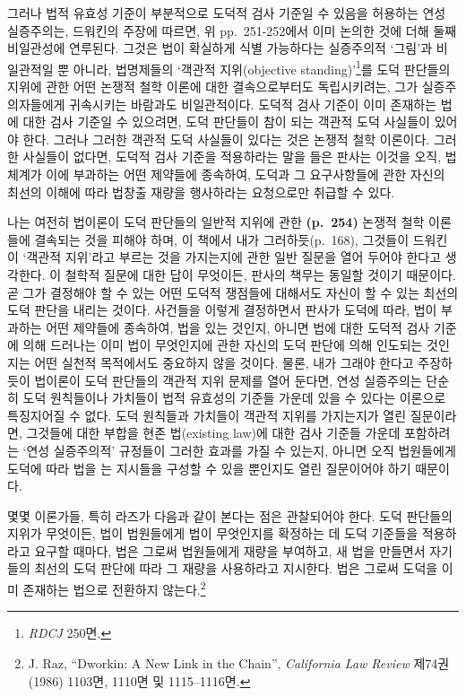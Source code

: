 그러나 법적 유효성 기준이 부분적으로 도덕적 검사 기준일 수 있음을
허용하는 연성 실증주의는, 드워킨의 주장에 따르면, 위 pp.~251-252에서
이미 논의한 것에 더해 둘째 비일관성에 연루된다. 그것은 법이 확실하게
식별 가능하다는 실증주의적 ‘그림’과 비일관적일 뿐 아니라, 법명제들의
‘객관적 지위(objective standing)’\footnote{\emph{RDCJ} 250면.}를 도덕
판단들의 지위에 관한 어떤 논쟁적 철학 이론에 대한 결속으로부터도
독립시키려는, 그가 실증주의자들에게 귀속시키는 바람과도 비일관적이다.
도덕적 검사 기준이 이미 존재하는 법에 대한 검사 기준일 수 있으려면, 도덕
판단들이 참이 되는 객관적 도덕 사실들이 있어야 한다. 그러나 그러한
객관적 도덕 사실들이 있다는 것은 논쟁적 철학 이론이다. 그러한 사실들이
없다면, 도덕적 검사 기준을 적용하라는 말을 들은 판사는 이것을 오직,
법체계가 이에 부과하는 어떤 제약들에 종속하여, 도덕과 그 요구사항들에
관한 자신의 최선의 이해에 따라 법창출 재량을 행사하라는 요청으로만
취급할 수 있다.

나는 여전히 법이론이 도덕 판단들의 일반적 지위에 관한 \textbf{(p.~254)}
논쟁적 철학 이론들에 결속되는 것을 피해야 하며, 이 책에서 내가
그러하듯(p.~168), 그것들이 드워킨이 ‘객관적 지위’라고 부르는 것을
가지는지에 관한 일반 질문을 열어 두어야 한다고 생각한다. 이 철학적
질문에 대한 답이 무엇이든, 판사의 책무는 동일할 것이기 때문이다. 곧 그가
결정해야 할 수 있는 어떤 도덕적 쟁점들에 대해서도 자신이 할 수 있는
최선의 도덕 판단을 내리는 것이다. 사건들을 이렇게 결정하면서 판사가
도덕에 따라, 법이 부과하는 어떤 제약들에 종속하여, 법을 
있는 것인지, 아니면 법에 대한 도덕적 검사 기준에 의해 드러나는 이미
 법이 무엇인지에 관한 자신의 도덕 판단에 의해 인도되는
것인지는 어떤 실천적 목적에서도 중요하지 않을 것이다. 물론, 내가 그래야
한다고 주장하듯이 법이론이 도덕 판단들의 객관적 지위 문제를 열어 둔다면,
연성 실증주의는 단순히 도덕 원칙들이나 가치들이 법적 유효성의 기준들
가운데 있을 수 있다는 이론으로 특징지어질 수 없다. 도덕 원칙들과
가치들이 객관적 지위를 가지는지가 열린 질문이라면, 그것들에 대한 부합을
현존 법(existing law)에 대한 검사 기준들 가운데 포함하려는 ‘연성
실증주의적’ 규정들이 그러한 효과를 가질 수 있는지, 아니면 오직
법원들에게 도덕에 따라 법을 는 지시들을 구성할 수 있을
뿐인지도 열린 질문이어야 하기 때문이다.

몇몇 이론가들, 특히 라즈가 다음과 같이 본다는 점은 관찰되어야 한다. 도덕
판단들의 지위가 무엇이든, 법이 법원들에게 법이 무엇인지를 확정하는 데
도덕 기준들을 적용하라고 요구할 때마다, 법은 그로써 법원들에게 재량을
부여하고, 새 법을 만들면서 자기들의 최선의 도덕 판단에 따라 그 재량을
사용하라고 지시한다. 법은 그로써 도덕을 이미 존재하는 법으로 전환하지
않는다.\footnote{J. Raz, “Dworkin: A New Link in the Chain”,
  \emph{California Law Review} 제74권 (1986) 1103면, 1110면 및
  1115--1116면.}

